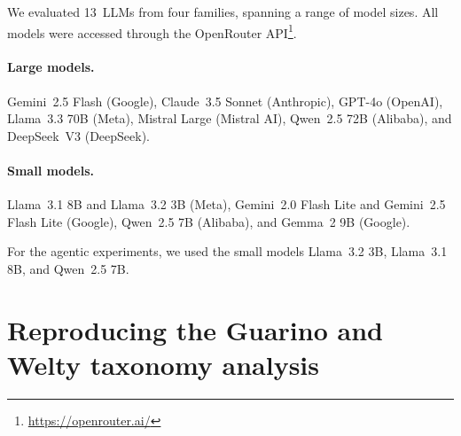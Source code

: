 \documentclass{IOS-Book-Article}
\begin{document}
We evaluated 13~LLMs from four families, spanning a range of model
sizes.  All models were accessed through the OpenRouter
API\footnote{\url{https://openrouter.ai/}}.

\paragraph{Large models.}
Gemini~2.5 Flash (Google), Claude~3.5 Sonnet (Anthropic), GPT-4o
(OpenAI), Llama~3.3 70B (Meta), Mistral Large (Mistral AI), Qwen~2.5
72B (Alibaba), and DeepSeek~V3 (DeepSeek).

\paragraph{Small models.}
Llama~3.1 8B and Llama~3.2 3B (Meta), Gemini~2.0 Flash Lite and
Gemini~2.5 Flash Lite (Google), Qwen~2.5 7B (Alibaba), and Gemma~2 9B
(Google).

For the agentic experiments, we used the small models Llama~3.2 3B,
Llama~3.1 8B, and Qwen~2.5 7B.

\section{Reproducing the Guarino and Welty taxonomy analysis}
\label{sec:guarino-repro}
\end{document}
